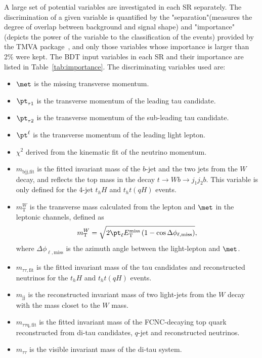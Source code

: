 A large set of potential variables are investigated in each SR separately. The discrimination of a given variable is quantified by the "separation"(measures the degree of overlap between background and signal shape) and "importance"(depicts the power of the variable to the classification of the events) provided by the TMVA package~\cite{Hocker:2007ht}, and only those variables whose importance is larger than 2\% were kept.
The BDT input variables in each SR and their importance are listed in Table~\ref{tab:importance}. The discriminating variables used are:
\begin{itemize}
\item $\met$ is the missing transverse momentum.
\item ${\pt}_{\tau1} $ is the transverse momentum of the leading tau candidate.
\item ${\pt}_{\tau2}$ is the transverse momentum of the sub-leading tau candidate.
\item ${\pt}^{\ell}$ is the transverse momentum of the leading light lepton.
\item $\chi^2$ derived from the kinematic fit of the neutrino momentum.
\item $m_{\text{bjj},\text{fit}}$ is the fitted invariant mass of the $b$-jet and the two jets from the $W$ decay, and reflects the top mass in the decay $t\to Wb \to j_1j_2b$. This variable is only defined for the 4-jet $t_hH$ and $t_ht(qH)$ events.
\item $m^{W}_{\text{T}}$ is the transverse mass calculated from the lepton and $\met$ in the leptonic channels, defined as
\begin{equation}
m^{W}_{\text{T}} = \sqrt{2 {\pt}_{\ell} E_{\text{T}}^{\text{miss}} \left(1-\cos\Delta\phi_{\ell,\text{miss}} \right)},  
\end{equation}
where $\Delta\phi_{\ell,\text{miss}}$ is the azimuth angle between the light-lepton and $\met$.  
\item $m_{\tau\tau,\text{fit}}$ is the fitted invariant mass of the tau candidates and reconstructed neutrinos for the $t_hH$ and $t_ht(qH)$ events. 
\item $m_{\text{jj}}$ is the reconstructed invariant mass of two light-jets from the $W$ decay with the mass closet to the $W$ mass.
\item $m_{\tau\tau\text{q},\text{fit}}$ is the fitted invariant mass of the FCNC-decaying top quark reconstructed from di-tau candidates, $q$-jet and reconstructed neutrinos.
\item $m_{\tau\tau}$ is the visible invariant mass of the di-tau system. %

\end{itemize}
